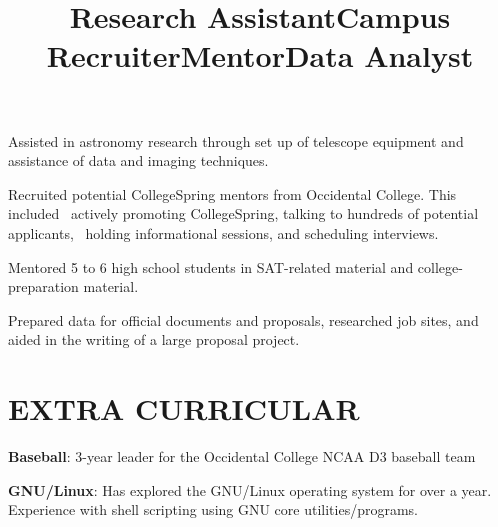 \documentclass[margin]{res}
\begin{document}
\begin{resume}
\title{\textbf{Research Assistant}}
\begin{position}
	Assisted in astronomy research through set up of telescope equipment and assistance of data and imaging techniques.
\end{position}

\title{\textbf{Campus Recruiter}}
\begin{position}
	Recruited potential CollegeSpring mentors from Occidental College. This included 
actively promoting CollegeSpring, talking to hundreds of potential applicants, 
holding informational sessions, and scheduling interviews.
\end{position}

\title{\textbf{Mentor}}
\begin{position}
	Mentored 5 to 6 high school students in SAT-related material and college-preparation material.
\end{position}

\title{\textbf{Data Analyst}}
\begin{position}
	Prepared data for official documents and proposals, researched job sites, and aided in the writing of a large proposal project.
\end{position}

\section{EXTRA CURRICULAR}
\par
\textbf{Baseball}: 3-year leader for the Occidental College NCAA D3 baseball team
\par
\textbf{GNU/Linux}: Has explored the GNU/Linux operating system for over a year. Experience with shell scripting using GNU core utilities/programs.


\end{resume}
\end{document}
